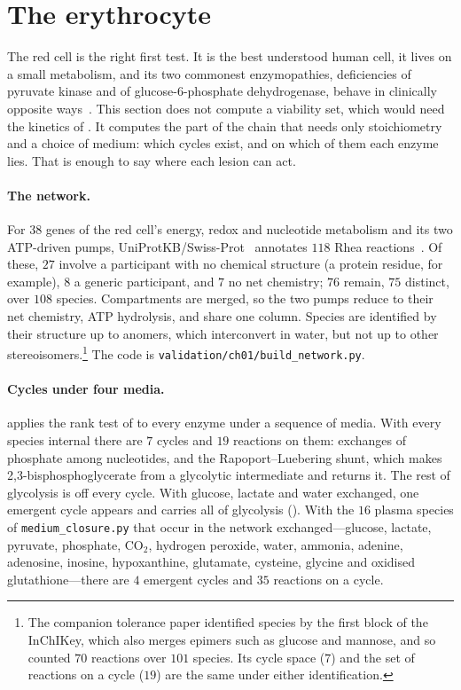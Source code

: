 \section{The erythrocyte}
\label{c1:sec-erythrocyte}

The red cell is the right first test. It is the best understood human cell,
it lives on a small metabolism, and its two commonest enzymopathies,
deficiencies of pyruvate kinase and of glucose-6-phosphate dehydrogenase,
behave in clinically opposite
ways~\citep{grace2018,zanella2005,luzzatto2020}. This section does not
compute a viability set, which would need the kinetics of
. It computes the part of the chain that needs only
stoichiometry and a choice of medium: which cycles exist, and on which of
them each enzyme lies. That is enough to say where each lesion can act.

\paragraph{The network.} \lnkC{} For $38$ genes of the red cell's energy,
redox and nucleotide metabolism and its two ATP-driven pumps,
UniProtKB/Swiss-Prot~\citep{uniprot2025} annotates $118$ Rhea
reactions~\citep{bansal2022}. Of these, $27$ involve a participant with no
chemical structure (a protein residue, for example), $8$ a generic
participant, and $7$ no net chemistry; $76$ remain, $75$ distinct, over
$108$ species. Compartments are merged, so the two pumps reduce to their net
chemistry, ATP hydrolysis, and share one column. Species are identified by
their structure up to anomers, which interconvert in water, but not up to
other stereoisomers.\footnote{The companion tolerance paper identified
species by the first block of the InChIKey, which also merges epimers such
as glucose and mannose, and so counted $70$ reactions over $101$ species.
Its cycle space ($7$) and the set of reactions on a cycle ($19$) are the
same under either identification.} The code is
\texttt{validation/ch01/build\_network.py}.

\paragraph{Cycles under four media.} \lnkC{}  applies the
rank test of  to every enzyme under a sequence of media.
With every species internal there are $7$ cycles and $19$ reactions on them:
exchanges of phosphate among nucleotides, and the Rapoport--Luebering shunt,
which makes 2,3-bisphosphoglycerate from a glycolytic intermediate and
returns it. The rest of glycolysis is off every cycle. With glucose, lactate
and water exchanged, one emergent cycle appears and carries all of
glycolysis (). With the $16$ plasma species of
\texttt{medium\_closure.py} that occur in the network exchanged---glucose,
lactate, pyruvate, phosphate, CO$_2$, hydrogen peroxide, water, ammonia,
adenine, adenosine, inosine, hypoxanthine, glutamate, cysteine, glycine and
oxidised glutathione---there are $4$ emergent cycles and $35$ reactions on a
cycle.

